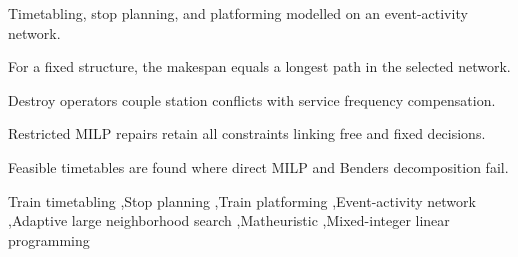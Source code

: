 \documentclass[preprint,12pt,authoryear]{elsarticle}
\begin{document}
\begin{frontmatter}
\begin{highlights}
\item Timetabling, stop planning, and platforming modelled on an event-activity network.
\item For a fixed structure, the makespan equals a longest path in the selected network.
\item Destroy operators couple station conflicts with service frequency compensation.
\item Restricted MILP repairs retain all constraints linking free and fixed decisions.
\item Feasible timetables are found where direct MILP and Benders decomposition fail.
\end{highlights}

\begin{keyword}
Train timetabling \sep Stop planning \sep Train platforming \sep Event-activity network \sep Adaptive large neighborhood search \sep Matheuristic \sep Mixed-integer linear programming
\end{keyword}
\end{frontmatter}














\appendix

\end{document}
